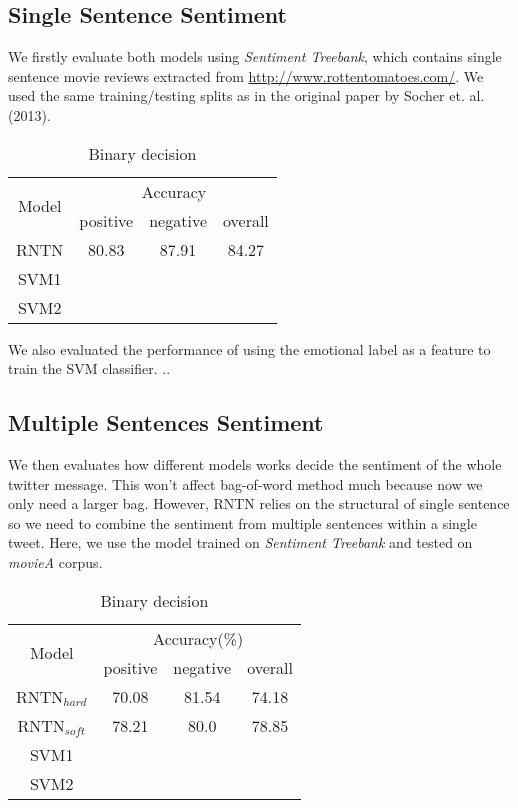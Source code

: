 \subsection{Single Sentence Sentiment}
We firstly evaluate both models using \textit{Sentiment Treebank}, which contains single sentence movie reviews extracted from \url{http://www.rottentomatoes.com/}. We used the same training/testing splits as in the original paper by Socher et. al. (2013). 

\begin{table}[H]
  \begin{center}
    \begin{tabular}{cccc}\hline
      \multirow{2}{*}{Model} 
      & \multicolumn{3}{c}{Accuracy} \\\cline{2-4}
    & positive & negative & overall \\ \hline
    RNTN  & 80.83      &   87.91   &  84.27      \\ 
    SVM1  & ~        &          &         \\ 
    SVM2  & ~        &          &         \\ \hline
    \end{tabular}
    \end{center}
    \caption{\label{exp1_1} Binary decision}
\end{table}

We also evaluated the performance of using the emotional label as a feature to train the SVM classifier. ..


\subsection{Multiple Sentences Sentiment}
We then evaluates how different models works decide the sentiment of the whole twitter message. This won't affect bag-of-word method much because now we only need a larger bag. However, RNTN relies on the structural of single sentence so we need to combine the sentiment from multiple sentences within a single tweet. Here, we use the model trained on \textit{Sentiment Treebank} and tested on \textit{movieA} corpus. 

\begin{table}[H]
  \begin{center}
    \begin{tabular}{cccc}\hline
      \multirow{2}{*}{Model} 
      & \multicolumn{3}{c}{Accuracy(\%)} \\\cline{2-4}
    & positive & negative & overall \\ \hline
    RNTN$_{hard}$  & 70.08 	    &  81.54       &  74.18     \\
    RNTN$_{soft}$  & 78.21     &   80.0	    &   78.85    \\ 
    SVM1  & ~        &          &         \\ 
    SVM2  & ~        &          &         \\ \hline
    \end{tabular}
    \end{center}
    \caption{\label{exp2_1} Binary decision}
\end{table}

